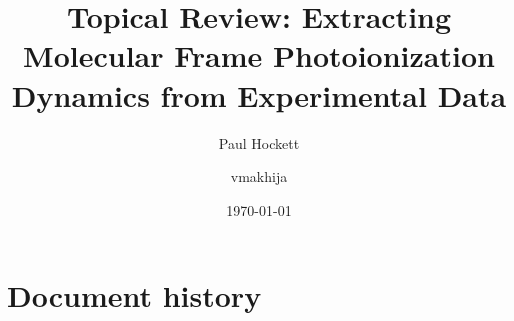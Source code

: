\documentclass[10pt]{article}
\begin{document}
\title{Topical Review: Extracting Molecular Frame Photoionization Dynamics from
Experimental Data}



\author[1]{Paul Hockett}%
\author[2]{vmakhija}%
%
%


\vspace{-1em}



  \date{\today}


\begingroup
\let\center\flushleft
\let\endcenter\endflushleft
\maketitle
\endgroup








\sloppy


\section*{Document history}
\end{document}
